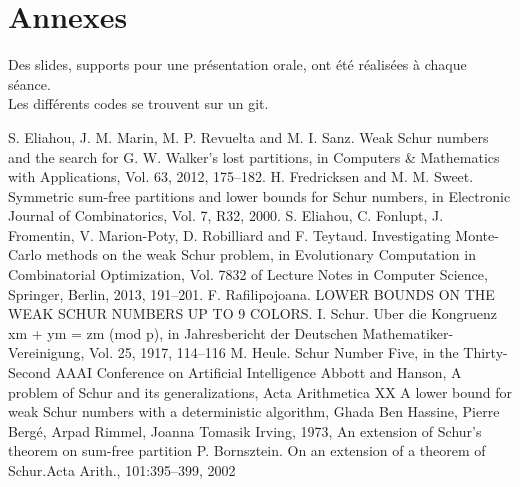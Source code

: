 \documentclass{report}
\begin{document}
\section{Annexes}
Des slides, supports pour une présentation orale, ont été réalisées à chaque séance.
\\ Les différents codes se trouvent sur un git.

\begin{thebibliography}{}
 S. Eliahou, J. M. Marin, M. P. Revuelta and M. I. Sanz. Weak Schur numbers and the search for G. W. Walker’s lost partitions, in Computers & Mathematics with Applications, Vol. 63, 2012, 175–182.
 H. Fredricksen and M. M. Sweet. Symmetric sum-free partitions and lower bounds for Schur numbers, in Electronic Journal of Combinatorics, Vol. 7, R32, 2000.
  S. Eliahou, C. Fonlupt, J. Fromentin, V. Marion-Poty, D. Robilliard and F. Teytaud. Investigating Monte-Carlo methods on the weak Schur problem, in Evolutionary Computation in Combinatorial Optimization, Vol. 7832 of Lecture Notes in Computer Science, Springer, Berlin, 2013, 191–201.
 F. Rafilipojoana. LOWER BOUNDS ON THE WEAK SCHUR NUMBERS UP TO 9 COLORS.
  I. Schur. Uber die Kongruenz xm + ym = zm (mod p), in Jahresbericht der Deutschen Mathematiker-Vereinigung, Vol. 25, 1917, 114–116
 M. Heule. Schur Number Five, in the Thirty-Second AAAI Conference on Artificial Intelligence 
 Abbott and Hanson, A problem of Schur and its generalizations, Acta Arithmetica XX
 A lower bound for weak Schur numbers with a deterministic algorithm, Ghada Ben Hassine, Pierre Bergé, Arpad Rimmel, Joanna Tomasik
 Irving, 1973, An extension of Schur’s theorem on sum-free partition
 P. Bornsztein. On an extension of a theorem of Schur.Acta Arith., 101:395–399, 2002
\end{thebibliography}
\end{document}
